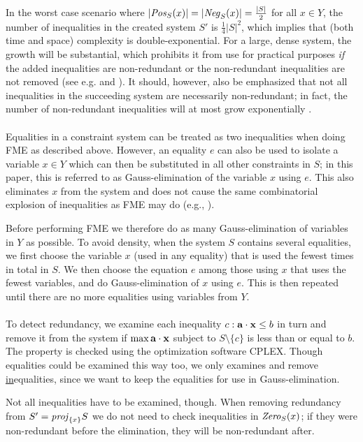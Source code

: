 In the worst case scenario where $|\mathit{Pos}_S(x)| = |\mathit{Neg}_S(x)| = \frac{|S|}{2}$ for all $x\in Y$, the number of inequalities in the created system $S'$ is $\frac{1}{4}|S|^2$, which implies that (both time and space) complexity is double-exponential. For a large, dense system, the growth will be substantial, which prohibits it from use for practical purposes \emph{if} the added inequalities are non-redundant or the non-redundant inequalities are not removed ({see e.g. \cite{lassez93} and \cite{lukatskii08}}). It should, however, also be emphasized that not all inequalities in the succeeding system are necessarily non-redundant; in fact, the number of non-redundant inequalities will at most grow exponentially \cite{monniaux10}.
\\\\
Equalities in a constraint system can be treated as two inequalities when doing FME as described above. However, an equality $e$ can also be used to isolate a variable $x\in Y$ which can then be substituted in all other constraints in $S$; in this paper, this is referred to as Gauss-elimination of the variable $x$ using $e$. This also eliminates $x$ from the system and does not cause the same combinatorial explosion of inequalities as FME may do (e.g., \cite{duffin74,simon05}). 

Before performing FME we therefore do as many Gauss-elimination of variables in $Y$ as possible.
%
To avoid density, when the system $S$ contains several equalities, we first choose the variable $x$ (used in any equality) that is used the fewest times in total in $S$. We then choose the equation $e$ among those using $x$ that uses the fewest variables, and do Gauss-elimination of $x$ using $e$. 
This is then repeated until there are no more equalities using variables from $Y$.
\\\\
To detect redundancy, we examine each inequality $c: \mathbf{a}\cdot \mathbf{x}\leq b$ in turn and remove it from the system if $\max \mathbf{a}\cdot \mathbf{x}$ subject to $S\setminus\{c\}$ is less than or equal to $b$. The property is checked using the optimization software CPLEX. Though equalities could be examined this way too, we only examines and remove \underline{in}equalities, since we want to keep the equalities for use in Gauss-elimination.

Not all inequalities have to be examined, though. When removing redundancy from $S' = \mathit{proj}_{\{x\}}S$ we do not need to check inequalities in $\mathit{Zero}_S(x)$; if they were non-redundant before the elimination, they will be non-redundant after.

